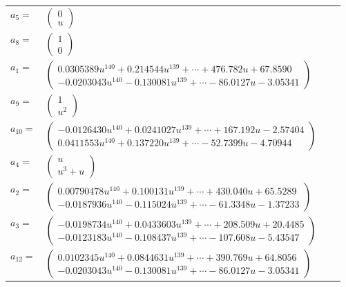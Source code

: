\documentclass[1p]{elsarticle_modified}
\theoremstyle{definition}
\begin{document}
\begin{tabular}{m{7pt} m{180pt} m{7pt} m{180pt} }
\flushright $a_{5}=$&$\begin{pmatrix}0\\u\end{pmatrix}$ \\
\flushright $a_{8}=$&$\begin{pmatrix}1\\0\end{pmatrix}$ \\
\flushright $a_{1}=$&$\begin{pmatrix}0.0305389 u^{140}+0.214544 u^{139}+\cdots+476.782 u+67.8590\\-0.0203043 u^{140}-0.130081 u^{139}+\cdots-86.0127 u-3.05341\end{pmatrix}$ \\
\flushright $a_{9}=$&$\begin{pmatrix}1\\u^2\end{pmatrix}$ \\
\flushright $a_{10}=$&$\begin{pmatrix}-0.0126430 u^{140}+0.0241027 u^{139}+\cdots+167.192 u-2.57404\\0.0411553 u^{140}+0.137220 u^{139}+\cdots-52.7399 u-4.70944\end{pmatrix}$ \\
\flushright $a_{4}=$&$\begin{pmatrix}u\\u^3+u\end{pmatrix}$ \\
\flushright $a_{2}=$&$\begin{pmatrix}0.00790478 u^{140}+0.100131 u^{139}+\cdots+430.040 u+65.5289\\-0.0187936 u^{140}-0.115024 u^{139}+\cdots-61.3348 u-1.37233\end{pmatrix}$ \\
\flushright $a_{3}=$&$\begin{pmatrix}-0.0198734 u^{140}+0.0433603 u^{139}+\cdots+208.509 u+20.4485\\-0.0123183 u^{140}-0.108437 u^{139}+\cdots-107.608 u-5.43547\end{pmatrix}$ \\
\flushright $a_{12}=$&$\begin{pmatrix}0.0102345 u^{140}+0.0844631 u^{139}+\cdots+390.769 u+64.8056\\-0.0203043 u^{140}-0.130081 u^{139}+\cdots-86.0127 u-3.05341\end{pmatrix}$ \\

\end{tabular}
\end{document}
